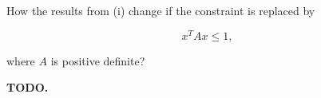 How the results from (i) change if the constraint is replaced by

$$
x^T A x \le 1,
$$

where $A$ is positive definite?

\begin{solution}
    \bf{TODO.}
    \ \\
    \vfill
\end{solution}